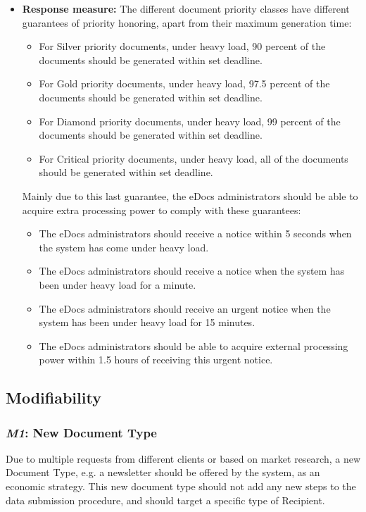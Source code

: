 \documentclass[a4paper,10pt]{article}
\begin{document}
\begin{itemize}
    \item \textbf{Response measure:}
        The different document priority classes have different guarantees of priority honoring, apart from their maximum generation time:
        \begin{itemize}
            \item For Silver priority documents, under heavy load, 90 percent of the documents should be generated within set deadline.
            \item For Gold priority documents, under heavy load, 97.5 percent of the documents should be generated within set deadline.
            \item For Diamond priority documents, under heavy load, 99 percent of the documents should be generated within set deadline.
            \item For Critical priority documents, under heavy load, all of the documents should be generated within set deadline.
        \end{itemize}
        Mainly due to this last guarantee, the eDocs administrators should be able to acquire extra processing power to comply with these guarantees:
        \begin{itemize}
            \item The eDocs administrators should receive a notice within 5 seconds when the system has come under heavy load.
            \item The eDocs administrators should receive a notice when the system has been under heavy load for a minute.
            \item The eDocs administrators should receive an urgent notice when the system has been under heavy load for 15 minutes.
            \item The eDocs administrators should be able to acquire external processing power within 1.5 hours of receiving this urgent notice.
        \end{itemize}
\end{itemize}

\subsection{Modifiability}
\subsubsection{\emph{M1}: New Document Type}
Due to multiple requests from different clients or based on market research, a new Document Type, e.g. a newsletter should be offered by the system, as an economic strategy. This new document type should not add any new steps to the data submission procedure, and should target a specific type of Recipient.
\end{document}
